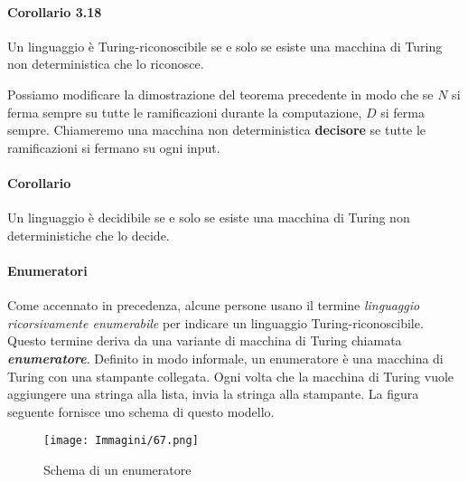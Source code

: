 \documentclass{article}
\begin{document}
\paragraph{Corollario 3.18}
\label{cor:da MdT deterministica a non deterministica}
\text{ }

\begin{tcolorbox}[colback=blue!10!white, colframe=blue!50!black, title=Corollario 3.18]
    Un linguaggio è Turing-riconoscibile se e solo se esiste una macchina di Turing non deterministica che lo riconosce.
\end{tcolorbox}

Possiamo modificare la dimostrazione del teorema precedente in modo che se $N$ si ferma sempre su tutte le ramificazioni durante la computazione, $D$ si ferma sempre.
Chiameremo una macchina non deterministica \textbf{decisore} se tutte le ramificazioni si fermano su ogni input.

\paragraph{Corollario}
\label{cor:da MdT deterministica a non deterministica}
\text{ }

\begin{tcolorbox}[colback=blue!10!white, colframe=blue!50!black, title=Corollario]
    Un linguaggio è decidibile se e solo se esiste una macchina di Turing non deterministiche che lo decide.
\end{tcolorbox}

\paragraph{Enumeratori}
\label{def:enumerator}
\text{ }

Come accennato in precedenza, alcune persone usano il termine \textit{linguaggio ricorsivamente enumerabile} per indicare un linguaggio Turing-riconoscibile.
Questo termine deriva da una variante di macchina di Turing chiamata \textbf{\textit{enumeratore}}.
Definito in modo informale, un enumeratore è una macchina di Turing con una stampante collegata.
Ogni volta che la macchina di Turing vuole aggiungere una stringa alla lista, invia la stringa alla stampante.
La figura seguente fornisce uno schema di questo modello.

\begin{figure}[H]
    \centering
    \texttt{[image: Immagini/67.png]}
    \caption{Schema di un enumeratore}
    \label{fig:enumerator_example}
\end{figure}
\end{document}
